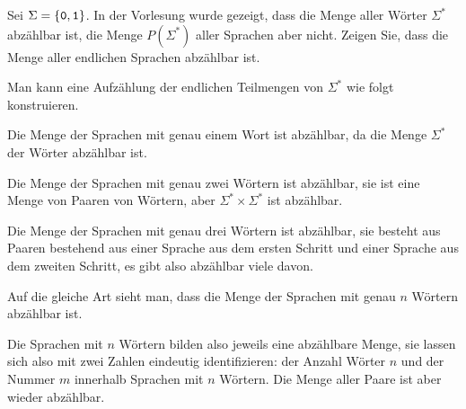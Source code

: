 Sei $\Sigma=\{{\tt 0},{\tt 1}\}$. In der Vorlesung wurde gezeigt, dass 
die Menge aller Wörter $\Sigma^*$ abzählbar ist, die Menge $P(\Sigma^*)$
aller Sprachen aber nicht. Zeigen Sie, dass die Menge aller endlichen
Sprachen abzählbar ist.


\begin{loesung}
Man kann eine Aufzählung der endlichen Teilmengen von $\Sigma^*$ wie
folgt konstruieren.
\begin{compactenum}
\item Die Menge der Sprachen mit genau einem Wort ist abzählbar, da die
Menge $\Sigma^*$ der Wörter abzählbar ist.
\item Die  Menge der Sprachen mit genau zwei Wörtern ist abzählbar,
sie ist eine Menge von Paaren von Wörtern, aber $\Sigma^*\times \Sigma^*$
ist abzählbar.
\item Die Menge der Sprachen mit genau drei Wörtern ist abzählbar,
sie besteht aus Paaren bestehend aus einer Sprache aus dem ersten
Schritt und einer Sprache aus dem zweiten Schritt, es gibt also 
abzählbar viele davon.
\item Auf die gleiche Art sieht man, dass die Menge der Sprachen mit
genau $n$ Wörtern abzählbar ist.
\end{compactenum}
Die Sprachen mit $n$ Wörtern bilden also jeweils eine abzählbare Menge,
sie lassen sich also mit zwei Zahlen eindeutig identifizieren: der Anzahl
Wörter $n$ und der Nummer $m$ innerhalb Sprachen mit $n$ Wörtern.
Die Menge aller Paare ist aber wieder abzählbar.
\end{loesung}

